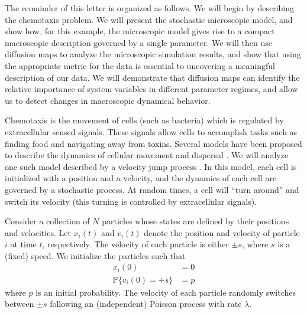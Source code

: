 \documentclass[prl, reprint, final, showkeys]{revtex4-1}
\begin{document}
The remainder of this letter is organized as follows. We will begin by describing the chemotaxis problem.
%
We will present the stochastic microscopic model, and show how, for this example, the microscopic model gives rise to a compact macroscopic description governed by a single parameter.
%
We will then use diffusion maps to analyze the microscopic simulation results, and show that using the appropriate metric for the data is essential to uncovering a meaningful description of our data.
%
We will demonstrate that diffusion maps can identify the relative importance of system variables in different parameter regimes, and allow us to detect changes in macroscopic dynamical behavior.



Chemotaxis is the movement of cells (such as bacteria) which is regulated by extracellular sensed signals.
%
These signals allow cells to accomplish tasks such as finding food and navigating away from toxins.
%
Several models have been proposed to describe the dynamics of cellular movement and dispersal \cite{othmer1988models, codling2008random}.
%
We will analyze one such model described by a velocity jump process \cite{othmer2000diffusion}.
%
In this model, each cell is initialized with a position and a velocity, and the dynamics of each cell are governed by a stochastic process.
%
At random times, a cell will ``turn around'' and switch its velocity (this turning is controlled by extracellular signals). 
%


Consider a collection of $N$ particles whose states are defined by their positions and velocities. 
%
Let $x_i(t)$ and $v_i(t)$ denote the position and velocity of particle $i$ at time $t$, respectively.
%
The velocity of each particle is either $\pm s$, where $s$ is a (fixed) speed. 
%
We initialize the particles such that
\begin{equation}\label{eqn:system}
\begin{aligned}
x_i(0) & = 0 \\
\mathbb{P} \{ v_i(0) = +s \} & = p
\end{aligned}
\end{equation}
where $p$ is an initial probability.
%
The velocity of each particle randomly switches between $\pm s$ following an (independent) Poisson process with rate $\lambda$.
%
\end{document}
